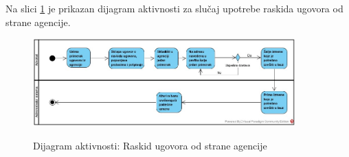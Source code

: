 \documentclass[20pt]{article}
\begin{document}
\newpage
{}
\setlength{\parindent}{1cm}
\fontsize{13}{18} \selectfont 
Na slici \ref{fig:dijagramAktivnostiRaskidUgovoraOdAgencije} je prikazan dijagram aktivnosti za slu\v{c}aj upotrebe raskida ugovora od strane agencije.

\begin{figure}[h]
        \centering
        \includegraphics[width=0.9\textwidth,height=0.39\textheight]{Pictures/raskidUgovoraOdStraneAgencije}\\
        \caption{Dijagram aktivnosti: Raskid ugovora od strane agencije}
        \label{fig:dijagramAktivnostiRaskidUgovoraOdAgencije}
    \end{figure}
\setlength{\parindent}{1cm}
\fontsize{13}{18} \selectfont 
\end{document}
